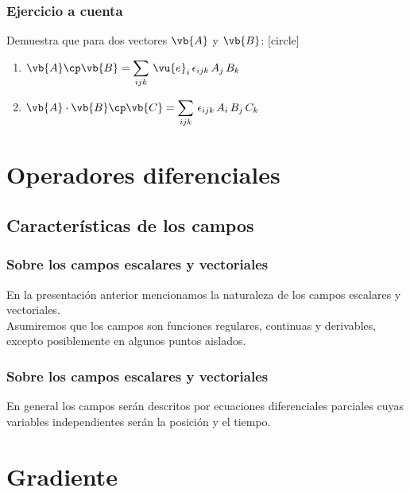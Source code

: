 \begin{frame}
\frametitle{Ejercicio a cuenta}
Demuestra que para dos vectores $\vb{A}$ y $\vb{B}$:
[circle]
\begin{enumerate}
\item $\vb{A} \cp \vb{B} = \displaystyle \sum_{ijk} \, \vu{e}_{i} \, \epsilon_{ijk} \, A_{j} \, B_{k}$ \\[1em]
\item $\vb{A} \cdot \vb{B} \cp \vb{C} = \displaystyle \sum_{ijk} \, \epsilon_{ijk} \, A_{i} \, B_{j} \, C_{k}$
\end{enumerate}
\end{frame}
\section{Operadores diferenciales}
\subsection{Características de los campos}
\begin{frame}
\frametitle{Sobre los campos escalares y vectoriales}
En la presentación anterior mencionamos la naturaleza de los campos escalares y vectoriales.
\\
\bigskip
\pause
Asumiremos que los campos son funciones regulares, continuas y derivables, excepto posiblemente en algunos puntos aislados.
\end{frame}
\begin{frame}
\frametitle{Sobre los campos escalares y vectoriales}
En general los campos serán descritos por ecuaciones diferenciales parciales cuyas variables independientes serán la posición y el tiempo.
\end{frame}
\section{Gradiente}
